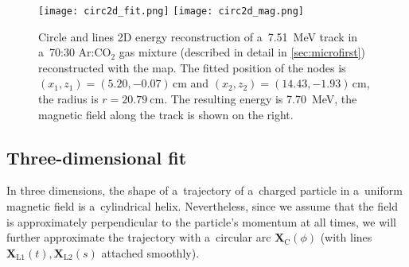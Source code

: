 			\begin{figure}
				\centering
				\texttt{[image: circ2d\_fit.png]}
				\hfill
				\texttt{[image: circ2d\_mag.png]}
				\caption{Circle and lines 2D energy reconstruction of a~\qty{7.51}{\MeV} track in a~70:30 Ar:CO$_2$ gas mixture (described in detail in \cref{sec:microfirst}) reconstructed with the map. The fitted position of the nodes is $(x_1,z_1) = (5.20,-0.07)\,\unit{\cm}$ and $(x_2,z_2) = (14.43,-1.93)\,\unit{\cm}$, the radius is $r = \qty{20.79}{\cm}$. The resulting energy is \qty{7.70}{\MeV}, the magnetic field along the track is shown on the right.}
				\label{fig:circle2d}
			\end{figure}
		
		\subsection{Three-dimensional fit}
			In three dimensions, the shape of a~trajectory of a~charged particle in a~uniform magnetic field is a~cylindrical helix. Nevertheless, since we assume that the field is approximately perpendicular to the particle's momentum at all times, we will further approximate the trajectory with a~circular arc $\mathbf{X}_\text{C}(\phi)$ (with lines $\mathbf{X}_\text{L1}(t),\mathbf{X}_\text{L2}(s)$ attached smoothly).
			
